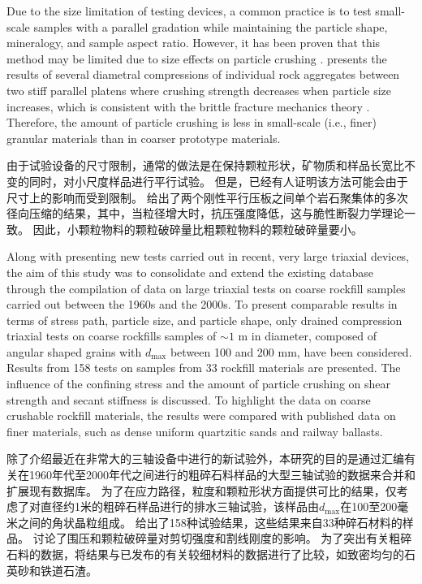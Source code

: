 \begin{ParaColumn}
    \switchcolumn*

    Due to the size limitation of testing devices, a common practice is to test small-scale samples with a parallel gradation while maintaining the particle shape, mineralogy, and sample aspect ratio. However, it has been proven that this method may be limited due to size effects on particle crushing \citep{Marachi1969,Frossard2012415,Ovalle20142199}.  presents the results of several diametral compressions of individual rock aggregates between two stiff parallel platens where crushing strength decreases when particle size increases, which is consistent with the brittle fracture mechanics theory \citep{Weibull19391}. Therefore, the amount of particle crushing is less in small-scale (i.e., finer) granular materials than in coarser prototype materials.

    \switchcolumn

    由于试验设备的尺寸限制，通常的做法是在保持颗粒形状，矿物质和样品长宽比不变的同时，对小尺度样品进行平行试验。 但是，已经有人证明该方法可能会由于尺寸上的影响而受到限制\citep{Marachi1969,Frossard2012415,Ovalle20142199}。 给出了两个刚性平行压板之间单个岩石聚集体的多次径向压缩的结果，其中，当粒径增大时，抗压强度降低，这与脆性断裂力学理论\citep{Weibull19391}一致。 因此，小颗粒物料的颗粒破碎量比粗颗粒物料的颗粒破碎量要小。

    \CrossColumnText{
        
    }

    \switchcolumn*

    Along with presenting new tests carried out in recent, very large triaxial devices, the aim of this study was to consolidate and extend the existing database through the compilation of data on large triaxial tests on coarse rockfill samples carried out between the 1960s and the 2000s. To present comparable results in terms of stress path, particle size, and particle shape, only drained compression triaxial tests on coarse rockfills samples of $\sim 1$ m in diameter, composed of angular shaped grains with $d_{\max}$ between 100 and 200 mm, have been considered. Results from 158 tests on samples from 33 rockfill materials are presented. The influence of the confining stress and the amount of particle crushing on shear strength and secant stiffness is discussed. To highlight the data on coarse crushable rockfill materials, the results were compared with published data on finer materials, such as dense uniform quartzitic sands and railway ballasts.

    \switchcolumn

    除了介绍最近在非常大的三轴设备中进行的新试验外，本研究的目的是通过汇编有关在1960年代至2000年代之间进行的粗碎石料样品的大型三轴试验的数据来合并和扩展现有数据库。 为了在应力路径，粒度和颗粒形状方面提供可比的结果，仅考虑了对直径约1米的粗碎石样品进行的排水三轴试验，该样品由$d_{\max}$在100至200毫米之间的角状晶粒组成。 给出了158种试验结果，这些结果来自33种碎石材料的样品。 讨论了围压和颗粒破碎量对剪切强度和割线刚度的影响。 为了突出有关粗碎石料的数据，将结果与已发布的有关较细材料的数据进行了比较，如致密均匀的石英砂和铁道石渣。

\end{ParaColumn}
